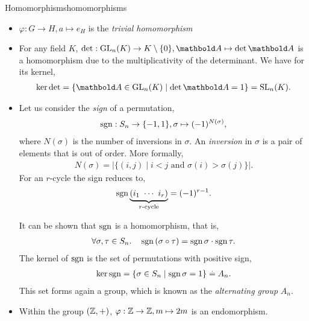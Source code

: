 \begin{ex}{Homomorphisms}{homomorphisms}
\begin{itemize}
    \item ${\varphi : G \to H, a \mapsto e_H}$ is the \emph{trivial homomorphism}
    
    \item For any field $K$, ${\det : \GL{n}{K} \to \woZ{K}, \mA \mapsto \det{\mA}}$ is a homomorphism due to the multiplicativity of the determinant. We have for its kernel, \begin{align}
        \ker{\det} = \{\mA \in \GL{n}{K} \mid \det{\mA} = 1\} = \SL{n}{K}. \label{eq:det_kernel}
    \end{align}
    
    \item Let us consider the \emph{sign} of a permutation, \begin{align}
        \operatorname*{sgn} : S_n \to \{-1, 1\}, \sigma \mapsto (-1)^{N(\sigma)},
    \end{align} where $N(\sigma)$ is the number of inversions in $\sigma$. An \emph{inversion} in $\sigma$ is a pair of elements that is out of order. More formally, \begin{align}
        N(\sigma) = |\{(i,j) \mid \text{$i < j$ and $\sigma(i) > \sigma(j)$}\}|.
    \end{align} For an $r$-cycle the sign reduces to, \begin{align}
        \operatorname*{sgn}{\underbrace{(i_1\ \cdots\ i_r)}_{\text{$r$-cycle}}} = (-1)^{r-1}.
    \end{align}
    
    It can be shown that $\operatorname*{sgn}$ is a homomorphism, that is, \begin{align}
        \forall \sigma, \tau \in S_n.\quad \operatorname*{sgn}{(\sigma \circ \tau)} = \operatorname*{sgn}{\sigma} \cdot \operatorname*{sgn}{\tau}.
    \end{align} The kernel of $\operatorname*{sgn}$ is the set of permutations with positive sign, \begin{align}
        \ker{\operatorname*{sgn}} = \{\sigma \in S_n \mid \operatorname*{sgn}{\sigma} = 1\} \overset{.}{=} A_n. \label{eq:alternating_group}
    \end{align} This set forms again a group, which is known as the \emph{alternating group} $A_n$.
    
    \item Within the group $(\mathbb{Z},+)$, $\varphi : \mathbb{Z} \to \mathbb{Z}, m \mapsto 2 m$ is an endomorphism.
\end{itemize}
\end{ex}

